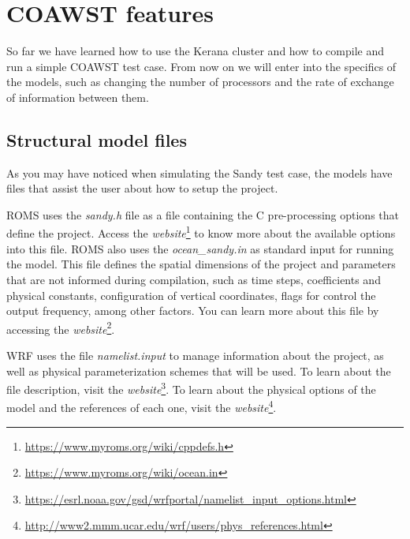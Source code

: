 \chapter{COAWST features}
\bigskip
\noindent So far we have learned how to use the Kerana cluster and how to compile and run a simple COAWST test case.
From now on we will enter into the specifics of the models, such as changing the number of processors
and the rate of exchange of information between them.
\bigskip

\section{Structural model files}
\bigskip

\noindent As you may have noticed when simulating the Sandy test case, the models have files that assist the user about how to setup the project.

\bigskip

\noindent ROMS uses the \textit{sandy.h} file as a file containing the C pre-processing options that define the project.
Access the \textcolor{bleu_cite}{\textit{website}\footnote{\textcolor{bleu_cite}{\href{https://www.myroms.org/wiki/cppdefs.h}{https://www.myroms.org/wiki/cppdefs.h}}}}
to know more about the available options into this file. ROMS also uses the \textit{ocean\_sandy.in} as standard input for
running the model. This file defines the spatial dimensions of the project and parameters that are not informed during compilation,
such as time steps, coefficients and physical constants, configuration of vertical coordinates, flags for
control the output frequency, among other factors. You can learn more about this file by accessing the
\textcolor{bleu_cite}{\textit{website}\footnote{\textcolor{bleu_cite}{\href{https://www.myroms.org/wiki/ocean.in}{https://www.myroms.org/wiki/ocean.in}}}}.
\bigskip

\noindent WRF uses the file \textit{namelist.input} to manage information about the project, as well as
physical parameterization schemes that will be used. To learn about the file description,
visit the \textcolor{bleu_cite}{\textit{website}\footnote{\textcolor{bleu_cite}{\href{https://esrl.noaa.gov/gsd/wrfportal/namelist\_input\_options.html}{https://esrl.noaa.gov/gsd/wrfportal/namelist\_input\_options.html}}}}.
To learn about the physical options of the model and the references of each one, visit the
\textcolor{bleu_cite}{\textit{website}\footnote{\textcolor{bleu_cite}{\href{http://www2.mmm.ucar.edu/wrf/users/phys\_references.html}{http://www2.mmm.ucar.edu/wrf/users/phys\_references.html}}}}.
\bigskip

